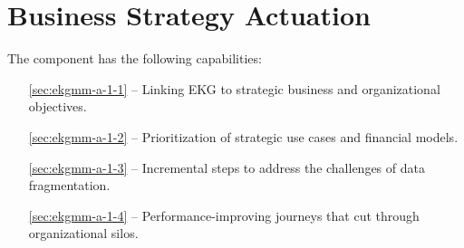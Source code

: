 \chapter{Business Strategy Actuation}\label{ch:ekgmm-a-1} %

The  component has the following capabilities:

\begin{itemize}[leftmargin=.5in]
  \item [\ref{sec:ekgmm-a-1-1}]  -- Linking EKG to strategic business and organizational objectives.
  \item [\ref{sec:ekgmm-a-1-2}]  -- Prioritization of strategic use cases and financial models.
  \item [\ref{sec:ekgmm-a-1-3}]  -- Incremental steps to address the challenges of data fragmentation.
  \item [\ref{sec:ekgmm-a-1-4}]  -- Performance-improving journeys that cut through organizational silos.
\end{itemize}





